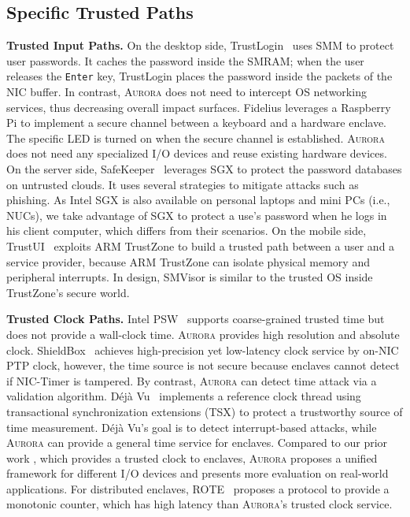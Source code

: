 \subsection{Specific Trusted Paths}

\textbf{Trusted Input Paths.}
On the desktop side, TrustLogin~\cite{zhang_trustlogin:_2015} uses SMM to protect user passwords. It caches the password inside the SMRAM; when the user releases the \texttt{Enter} key, TrustLogin places the password inside the packets of the NIC buffer. In contrast, \textsc{Aurora} does not need to intercept OS networking services, thus decreasing overall impact surfaces.
Fidelius \cite{DBLP:journals/corr/abs-1809-04774} leverages a Raspberry Pi to implement a secure channel between a keyboard and a hardware enclave. The specific LED is turned on when the secure channel is established.  \textsc{Aurora} does not need any specialized I/O devices and reuse existing hardware devices.
On the server side, SafeKeeper~\cite{DBLP:conf/www/KrawieckaKPMA18} leverages SGX to protect the password databases on untrusted clouds. It uses several strategies to mitigate attacks such as phishing. As Intel SGX is also available on personal laptops and mini PCs (i.e., NUCs), we take advantage of SGX to protect a use's password when he logs in his client computer, which differs from their scenarios.
On the mobile side, TrustUI~\cite{DBLP:conf/apsys/LiMHXZCL14} exploits ARM TrustZone to build a trusted path between a user and a service provider, because ARM TrustZone can isolate physical memory and peripheral interrupts. In design, SMVisor is similar to the trusted OS inside TrustZone's secure world.

\textbf{Trusted Clock Paths.} Intel PSW~\cite{intel_psw} supports coarse-grained trusted time but does not provide a wall-clock time. \textsc{Aurora} provides high resolution and absolute clock. ShieldBox~\cite{DBLP:conf/sosr/TrachKGABF18} achieves high-precision yet low-latency clock service by on-NIC PTP clock, however, the time source is not secure because enclaves cannot detect if NIC-Timer is tampered. By contrast, \textsc{Aurora} can detect time attack via a validation algorithm. Déjà Vu~\cite{DBLP:conf/ccs/ChenZRZ17} implements a reference clock thread using transactional synchronization extensions (TSX) to protect a trustworthy source of time measurement. Déjà Vu's goal is to detect interrupt-based attacks, while \textsc{Aurora} can provide a general time service for enclaves. Compared to our prior work \cite{DBLP:conf/eurosys/LiangL18}, which provides a trusted clock to enclaves, \textsc{Aurora} proposes a unified framework for different I/O devices and presents more evaluation on real-world applications. For distributed enclaves, ROTE~\cite{DBLP:conf/uss/MateticAKDSGJC17} proposes a protocol to provide a monotonic counter, which has high latency than \textsc{Aurora}'s trusted clock service.

